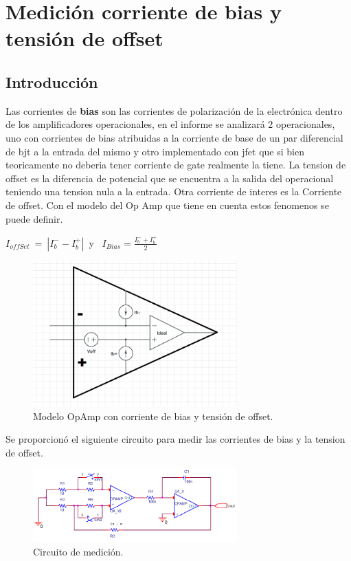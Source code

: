 \documentclass[a4paper]{article}
\begin{document}
\section{Medici\'on corriente de bias y tensi\'on de offset}

\subsection{Introducción}
Las corrientes de \textbf{bias} son las corrientes de polarización de la electrónica dentro de los amplificadores operacionales, en el informe se analizará 2 operacionales, uno con corrientes de bias atribuidas a la corriente de base de un par diferencial de bjt a la entrada del mismo y otro implementado con jfet que si bien teoricamente no deberia tener corriente de gate realmente la tiene.
La tension de offset es la diferencia de potencial que se encuentra a la salida del operacional teniendo una tension nula a la entrada.
Otra corriente de interes es la Corriente de offset.
Con el modelo del Op Amp que tiene en cuenta estos fenomenos se puede definir.\newline
 	
 $I_{offSet} \ = \ |I_b^{-}-I_b^{+}|$\ y \ $I_{Bias}= \frac{I_b^-+I_b^{+}}{2}$
\begin{figure}[htb]	
	\centering
	\includegraphics[width=0.7\textwidth]{imagenes/opampReal.PNG}
	\caption{Modelo OpAmp con corriente de bias y tensión de offset.}
	\label{fig:OpampBias}
\end{figure}



Se proporcionó el siguiente circuito para medir las corrientes de bias y la tension de offset.

\begin{figure}[htb]	
	\centering
	\includegraphics[width=0.7\textwidth]{imagenes/CircMedicion.PNG}
	\caption{Circuito de medición.}
	\label{fig:CircMedicion}
\end{figure}
\end{document}
